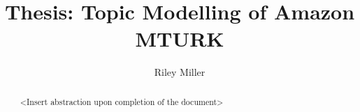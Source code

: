 \documentclass[letterpaper,12pt]{article}
\title{Thesis: Topic Modelling of Amazon MTURK}
\author{Riley Miller}
\begin{document}


\frontmatter


\maketitle
\newpage


\makecopyright{\the\year}
\newpage


\makesubmittal
\newpage


\begin{abstract}
<Insert abstraction upon completion of the document>
\end{abstract}

\newpage


\tableofcontents
\newpage



\listoffigures
\newpage
\listoftables
\newpage




\end{document}
